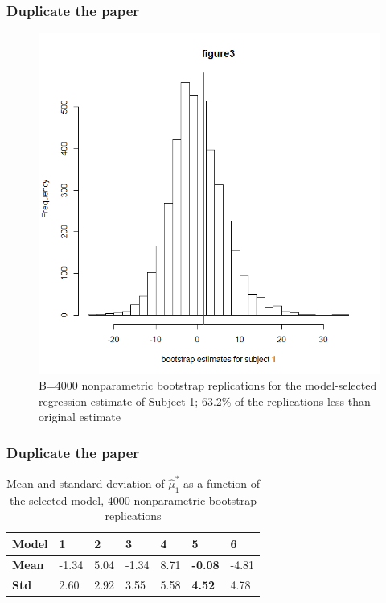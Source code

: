 \documentclass{beamer}
\begin{document}
\begin{frame}
\frametitle{Duplicate the paper}
\begin{figure}[h]
\centering
\includegraphics[width=200bp, height= 180bp]{figure3.png}
\caption{B=4000 nonparametric bootstrap replications for the model-selected regression estimate of Subject 1; 63.2\% of the replications less than original estimate}
\end{figure}
\end{frame}
\begin{frame}
\frametitle{Duplicate the paper}
\begin{table}[]
\centering
\caption{Mean and standard deviation of $\hat{\mu}_1 ^*$ as a function of the selected model, 4000 nonparametric bootstrap replications}
\label{my-label}
\begin{tabular}{|l|l|l|l|l|l|l|}
\hline
\textbf{Model} & \textbf{1} & \textbf{2} & \textbf{3} & \textbf{4} & \textbf{5}     & \textbf{6} \\ \hline
\textbf{Mean}  & -1.34      & 5.04       & -1.34      & 8.71       & \textbf{-0.08} & -4.81      \\ \hline
\textbf{Std}   & 2.60       & 2.92       & 3.55       & 5.58       & \textbf{4.52}  & 4.78       \\ \hline
\end{tabular}
\end{table}
\end{frame}
\end{document}
